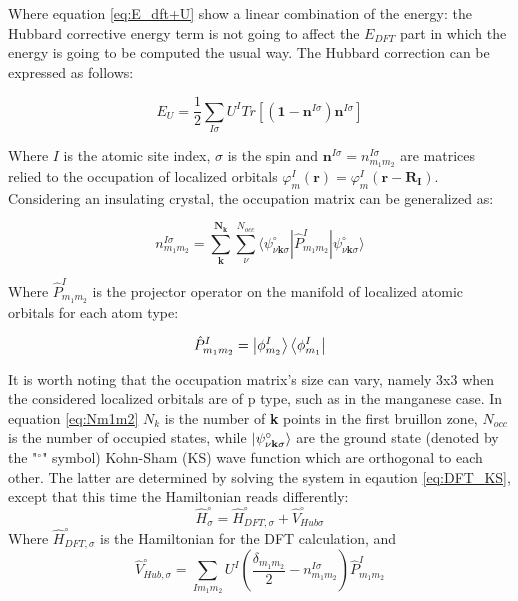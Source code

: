 Where equation \ref{eq:E_dft+U} show a linear combination of the energy: the Hubbard corrective energy term is not going to affect the $E_{DFT}$ part in which the energy is going to be computed the usual way. The Hubbard correction can be expressed as follows:


\begin{equation}
E_{U} = \frac{1}{2}\sum_{I \sigma} 
U^{I} Tr\left[
\left(
\mathbf{1}-\mathbf{n}^{I \sigma}
\right)
\mathbf{n}^{I \sigma}
\right]
\label{eq:E_U}
\end{equation}

Where $I$ is the atomic site index, $\sigma$ is the spin and $\mathbf{n}^{I \sigma} = n_{m_1 m_2}^{I \sigma}$ are matrices relied to the occupation of localized orbitals $\varphi_m^I(\mathbf{r}) = \varphi_m^I(\mathbf{r-R_I})$. Considering an insulating crystal, the occupation matrix can be generalized as:

\begin{equation}
n_{m_1 m_2}^{I \sigma} = 
\sum_\mathbf{k}^\mathbf{N_k}
\sum_\nu^{N_{occ}}
\langle 
    \psi^{\circ}_{\nu\mathbf{k}\sigma}
    \left| 
        \hat{P}^I_{m_1 m_2}
    \right|
    \psi^{\circ}_{\nu\mathbf{k}\sigma}
\rangle
\label{eq:Nm1m2}
\end{equation}

Where $\hat{P}^I_{m_1 m_2}$ is the projector operator on the manifold of localized atomic orbitals for each atom type:

\begin{equation}
\hat{P}^I_{m_1 m_2} = \ket{\phi^I_{m_2}}\bra{\phi^I_{m_1}}
\label{eq:P_proj}
\end{equation}

It is worth noting that the occupation matrix's size can vary, namely 3x3 when the considered localized orbitals are of p type, such as in the manganese case. In equation \ref{eq:Nm1m2} $N_k$ is the number of \textbf{k} points in the first bruillon zone, $N_{occ}$ is the number of occupied states, while $\ket{\psi^{\circ}_{\nu\mathbf{k}\sigma}}$ are the ground state (denoted by the "$^\circ$" symbol) Kohn-Sham (KS) wave function which are orthogonal to each other. The latter are determined by solving the system in eqaution \ref{eq:DFT_KS}, except that this time the Hamiltonian reads differently:
\begin{equation}
\hat{H}^\circ_{\sigma} = \hat{H}^\circ_{DFT,\sigma} + \hat{V}^\circ_{Hub\sigma}
\label{eq:H_DFT+U}
\end{equation}
Where $\hat{H}^\circ_{DFT,\sigma}$ is the Hamiltonian for the DFT calculation, and
\begin{equation}
\hat{V}^\circ_{Hub,\sigma} = \sum_{I m_1 m_2} U^I
\left ( 
\frac{\delta_{m_1 m_2}}{2}- n_{m_1 m_2}^{I \sigma}
\right )
\hat{P}^I_{m_1 m_2}
\label{eq:V_Hub}
\end{equation}

